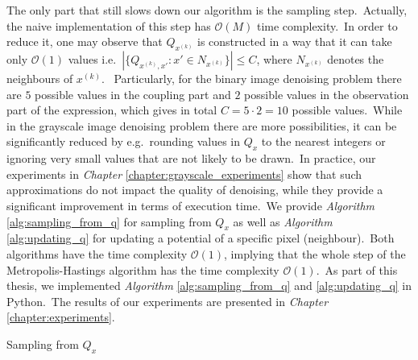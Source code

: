 \documentclass[shortabstract, english, lic]{iithesis}
\theoremstyle{default_theorem_style}\newtheorem{theorem}{Theorem}
\theoremstyle{default_theorem_style}\newtheorem{definition}{Definition}
\begin{document}
\noindent The only part that still slows down our algorithm is the sampling step.\ Actually, the naive implementation
of this step has $\mathcal{O}(M)$ time complexity.\ In order to reduce it, one may
observe that $Q_{x^{(k)}}$ is constructed in a way that it can take only $\mathcal{O}(1)$ values
i.e.\ $|\{ Q_{x^{(k)}, x'} : x' \in N_{x^{(k)}} \}| \leq C$, where $N_{x^{(k)}}$ denotes the neighbours of
$x^{(k)}$. \ Particularly, for the binary image denoising problem there are $5$ possible values in the coupling part
and $2$ possible values in the observation part of the expression, which gives in total $C = 5 \cdot 2 = 10$ possible
values.\ While in the grayscale image denoising problem there are more possibilities, it can be significantly reduced
by e.g.\ rounding values in $Q_x$ to the nearest integers or ignoring very small values that are not likely to be
drawn.\ In practice, our experiments in \textit{Chapter} \ref{chapter:grayscale_experiments} show that such
approximations do not impact the quality of denoising, while they provide a significant improvement in terms of
execution time.\ We provide \textit{Algorithm} \ref{alg:sampling_from_q} for sampling
from $Q_x$ as well as \textit{Algorithm} \ref{alg:updating_q} for updating a potential of a specific pixel
(neighbour).\ Both algorithms have the time complexity $\mathcal{O}(1)$, implying that the whole step of the
Metropolis-Hastings algorithm has the time complexity $\mathcal{O}(1)$.\ As part of this thesis, we implemented
\textit{Algorithm} \ref{alg:sampling_from_q} and \ref{alg:updating_q} in Python.\ The results of our experiments are
presented in \textit{Chapter} \ref{chapter:experiments}.

\begin{algorithm}[H]
\caption{Sampling from $Q_x$}\label{alg:sampling_from_q}
\begin{algorithmic}[1]
\end{algorithmic}
\end{algorithm}
\end{document}
